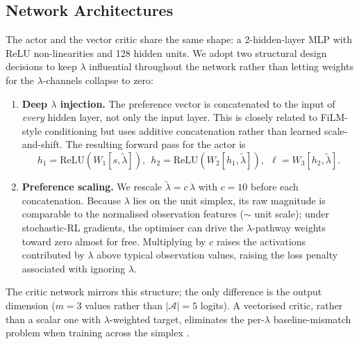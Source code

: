 \documentclass[12pt, letterpaper]{article}
\begin{document}
\subsection{Network Architectures}
\label{sec:method-arch}
The actor and the vector critic share the same shape: a 2-hidden-layer MLP with ReLU non-linearities and 128 hidden units. We adopt two structural design decisions to keep $\lambda$ influential throughout the network rather than letting weights for the $\lambda$-channels collapse to zero:
\begin{enumerate}
    \item \textbf{Deep $\lambda$ injection.} The preference vector is concatenated to the input of \emph{every} hidden layer, not only the input layer. This is closely related to FiLM-style conditioning \cite{perez2018film} but uses additive concatenation rather than learned scale-and-shift. The resulting forward pass for the actor is
    \begin{equation*}
        h_1 = \mathrm{ReLU}(W_1 [s, \tilde{\lambda}]),\ \ h_2 = \mathrm{ReLU}(W_2 [h_1, \tilde{\lambda}]),\ \ \ell = W_3 [h_2, \tilde{\lambda}].
    \end{equation*}
    \item \textbf{Preference scaling.} We rescale $\tilde{\lambda} = c\,\lambda$ with $c=10$ before each concatenation. Because $\lambda$ lies on the unit simplex, its raw magnitude is comparable to the normalised observation features ($\sim$ unit scale); under stochastic-RL gradients, the optimiser can drive the $\lambda$-pathway weights toward zero almost for free. Multiplying by $c$ raises the activations contributed by $\lambda$ above typical observation values, raising the loss penalty associated with ignoring $\lambda$.
\end{enumerate}
The critic network mirrors this structure; the only difference is the output dimension ($m=3$ values rather than $|\mathcal{A}|=5$ logits). A vectorised critic, rather than a scalar one with $\lambda$-weighted target, eliminates the per-$\lambda$ baseline-mismatch problem when training across the simplex \cite{abels2019dynamic}.
\end{document}
